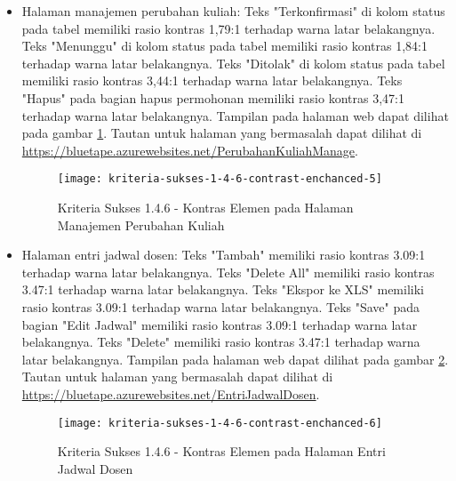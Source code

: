 \begin{itemize}
    \item Halaman manajemen perubahan kuliah: Teks "Terkonfirmasi" di kolom status pada tabel memiliki rasio kontras 1,79:1 terhadap warna latar belakangnya. Teks "Menunggu" di kolom status pada tabel memiliki rasio kontras 1,84:1 terhadap warna latar belakangnya. Teks "Ditolak" di kolom status pada tabel memiliki rasio kontras 3,44:1 terhadap warna latar belakangnya. Teks "Hapus" pada bagian hapus permohonan memiliki rasio kontras 3,47:1 terhadap warna latar belakangnya. Tampilan pada halaman web dapat dilihat pada gambar \ref{fig:1.4.6_contrast_enchanced_5}. Tautan untuk halaman yang bermasalah dapat dilihat di \url{https://bluetape.azurewebsites.net/PerubahanKuliahManage}.
    \begin{figure}[H]
        \centering  
        \texttt{[image: kriteria-sukses-1-4-6-contrast-enchanced-5]}  
        \caption[Kriteria Sukses 1.4.6 - Kontras Elemen pada Halaman Manajemen Perubahan Kuliah]{Kriteria Sukses 1.4.6 - Kontras Elemen pada Halaman Manajemen Perubahan Kuliah}
        \label{fig:1.4.6_contrast_enchanced_5}  
    \end{figure} 
    
    \item Halaman entri jadwal dosen: Teks "Tambah" memiliki rasio kontras 3.09:1 terhadap warna latar belakangnya. Teks "Delete All" memiliki rasio kontras 3.47:1 terhadap warna latar belakangnya. Teks "Ekspor ke XLS" memiliki rasio kontras 3.09:1 terhadap warna latar belakangnya. Teks "Save" pada bagian "Edit Jadwal" memiliki rasio kontras 3.09:1 terhadap warna latar belakangnya. Teks "Delete" memiliki rasio kontras 3.47:1 terhadap warna latar belakangnya. Tampilan pada halaman web dapat dilihat pada gambar \ref{fig:1.4.6_contrast_enchanced_6}. Tautan untuk halaman yang bermasalah dapat dilihat di \url{https://bluetape.azurewebsites.net/EntriJadwalDosen}.
    \begin{figure}[H]
        \centering  
        \texttt{[image: kriteria-sukses-1-4-6-contrast-enchanced-6]}  
        \caption[Kriteria Sukses 1.4.6 - Kontras Elemen pada Halaman Entri Jadwal Dosen]{Kriteria Sukses 1.4.6 - Kontras Elemen pada Halaman Entri Jadwal Dosen}
        \label{fig:1.4.6_contrast_enchanced_6}  
    \end{figure} 
    

\end{itemize}
